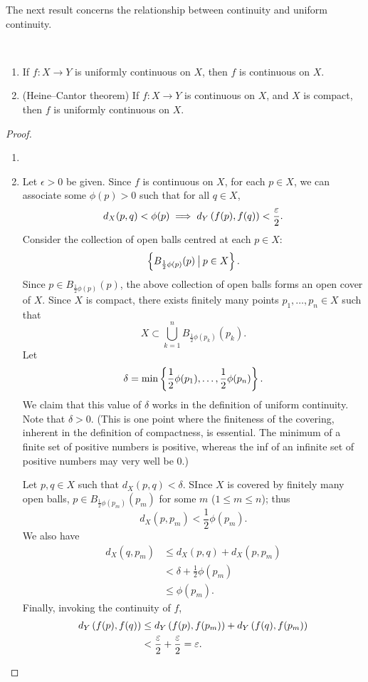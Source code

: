 The next result concerns the relationship between continuity and uniform continuity.

\begin{lemma}\label{lemma:continuity-uniform-continuity} \
\begin{enumerate}[label=(\roman*)]
\item If $f\colon X\to Y$ is uniformly continuous on $X$, then $f$ is continuous on $X$.
\item (Heine--Cantor theorem) If $f\colon X\to Y$ is continuous on $X$, and $X$ is compact, then $f$ is uniformly continuous on $X$.
\end{enumerate}
\end{lemma}

\begin{proof} \
\begin{enumerate}[label=(\roman*)]
\item 
\item Let $\epsilon>0$ be given. Since $f$ is continuous on $X$, for each $p\in X$, we can associate some $\phi(p)>0$ such that for all $q\in X$,
\[d_X(p,q)<\phi(p)\implies d_Y\left(f(p),f(q)\right)<\frac{\varepsilon}{2}.\]
Consider the collection of open balls centred at each $p\in X$:
\[\left\{B_{\frac{1}{2}\phi(p)}(p)\:\big|\:p\in X\right\}.\]
Since $p\in B_{\frac{1}{2}\phi(p)}(p)$, the above collection of open balls forms an open cover of $X$. Since $X$ is compact, there exists finitely many points $p_1,\dots,p_n\in X$ such that
\[X\subset\bigcup_{k=1}^{n}B_{\frac{1}{2}\phi(p_k)}(p_k).\]
Let
\[\delta=\min\left\{\frac{1}{2}\phi(p_1),\dots,\frac{1}{2}\phi(p_n)\right\}.\]
We claim that this value of $\delta$ works in the definition of uniform continuity. Note that $\delta>0$. (This is one point where the finiteness of the covering, inherent in the definition of compactness, is essential. The minimum of a finite set of positive numbers is positive, whereas the inf of an infinite set of positive numbers may very well be 0.) 

Let $p,q\in X$ such that $d_X(p,q)<\delta$. SInce $X$ is covered by finitely many open balls, $p\in B_{\frac{1}{2}\phi(p_m)}(p_m)$ for some $m$ ($1\le m\le n$); thus
\[d_X(p,p_m)<\frac{1}{2}\phi(p_m).\]
We also have
\begin{align*}
d_X(q,p_m)&\le d_X(p,q)+d_X(p,p_m)\\
&<\delta+\frac{1}{2}\phi(p_m)\\
&\le\phi(p_m).
\end{align*}
Finally, invoking the continuity of $f$,
\begin{align*}
d_Y\left(f(p),f(q)\right)&\le d_Y\left(f(p),f(p_m)\right)+d_Y\left(f(q),f(p_m)\right)\\
&<\frac{\varepsilon}{2}+\frac{\varepsilon}{2}=\varepsilon.
\end{align*}
\end{enumerate}
\end{proof}

